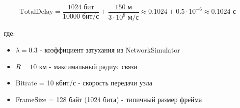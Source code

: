 \begin{equation}
\text{TotalDelay} = \frac{1024 \text{ бит}}{10000 \text{ бит/с}} + \frac{150 \text{ м}}{3 \cdot 10^8 \text{ м/с}} \approx 0.1024 + 0.5 \cdot 10^{-6} \approx 0.1024 \text{ с}
\end{equation}

где:
\begin{itemize}
\item $\lambda=0.3$ - коэффициент затухания из NetworkSimulator
\item $R=10$ км - максимальный радиус связи
\item Bitrate = 10 кбит/с - скорость передачи узла
\item FrameSize = 128 байт (1024 бита) - типичный размер фрейма
\end{itemize}